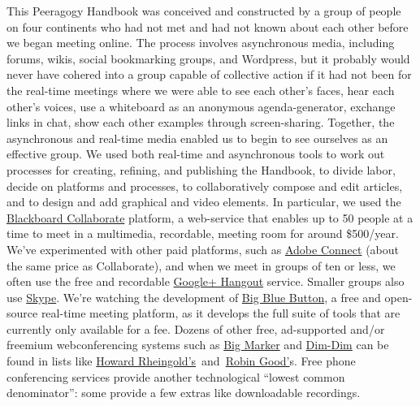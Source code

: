 This Peeragogy Handbook was conceived and constructed by a group of
people on four continents who had not met and had not known about each
other before we began meeting online. The process involves asynchronous
media, including forums, wikis, social bookmarking groups, and
Wordpress, but it probably would never have cohered into a group capable
of collective action if it had not been for the real-time meetings where
we were able to see each other's faces, hear each other's voices, use a
whiteboard as an anonymous agenda-generator, exchange links in chat,
show each other examples through screen-sharing. Together, the
asynchronous and real-time media enabled us to begin to see ourselves as
an effective group. We used both real-time and asynchronous tools to
work out processes for creating, refining, and publishing the Handbook,
to divide labor, decide on platforms and processes, to collaboratively
compose and edit articles, and to design and add graphical and video
elements. In particular, we used the
\href{http://www.blackboard.com/platforms/collaborate/overview.aspx}{Blackboard
Collaborate} platform, a web-service that enables up to 50 people at a
time to meet in a multimedia, recordable, meeting room for around
\$500/year. We've experimented with other paid platforms, such as
\href{http://success.adobe.com/en/na/sem/products/connect/1109\_6011\_connect\_webinars.html}{Adobe
Connect} (about the same price as Collaborate), and when we meet in
groups of ten or less, we often use the free and recordable
\href{http://www.google.com/+/learnmore/hangouts/}{Google+ Hangout}
service. Smaller groups also use \href{http://www.skype.com}{Skype}.
We're watching the development of
\href{http://www.bigbluebutton.org/}{Big Blue Button}, a free and
open-source real-time meeting platform, as it develops the full suite of
tools that are currently only available for a fee. Dozens of other free,
ad-supported and/or freemium webconferencing systems such as
\href{http://www.bigmarker.com/about}{Big Marker} and
\href{http://www.dimdim.com}{Dim-Dim} can be found in lists like
\href{http://delicious.com/hrheingold/webconferencing}{Howard
Rheingold's}~and~\href{http://www.mindmeister.com/12213323/best-online-collaboration-tools-2012-robin-good-s-collaborative-map}{Robin
Good'}s. Free phone conferencing services provide another technological
``lowest common denominator'': some provide a few extras like
downloadable recordings.

